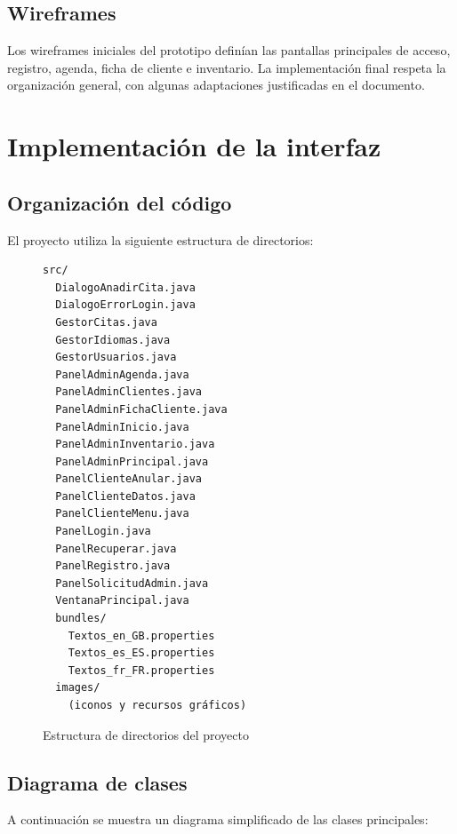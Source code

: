 \documentclass[12pt,a4paper]{report}
\begin{document}
\section{Wireframes}
Los wireframes iniciales del prototipo definían las pantallas principales de acceso, registro, agenda, ficha de cliente e inventario. La implementación final respeta la organización general, con algunas adaptaciones justificadas en el documento.

\chapter{Implementación de la interfaz}
\section{Organización del código}
El proyecto utiliza la siguiente estructura de directorios:

\begin{figure}[htbp]
    \centering
    \begin{minipage}{0.8\textwidth}
    \begin{verbatim}
src/
  DialogoAnadirCita.java
  DialogoErrorLogin.java
  GestorCitas.java
  GestorIdiomas.java
  GestorUsuarios.java
  PanelAdminAgenda.java
  PanelAdminClientes.java
  PanelAdminFichaCliente.java
  PanelAdminInicio.java
  PanelAdminInventario.java
  PanelAdminPrincipal.java
  PanelClienteAnular.java
  PanelClienteDatos.java
  PanelClienteMenu.java
  PanelLogin.java
  PanelRecuperar.java
  PanelRegistro.java
  PanelSolicitudAdmin.java
  VentanaPrincipal.java
  bundles/
    Textos_en_GB.properties
    Textos_es_ES.properties
    Textos_fr_FR.properties
  images/
    (iconos y recursos gráficos)
    \end{verbatim}
    \end{minipage}
    \caption{Estructura de directorios del proyecto}
\end{figure}

\section{Diagrama de clases}
A continuación se muestra un diagrama simplificado de las clases principales:
\end{document}
